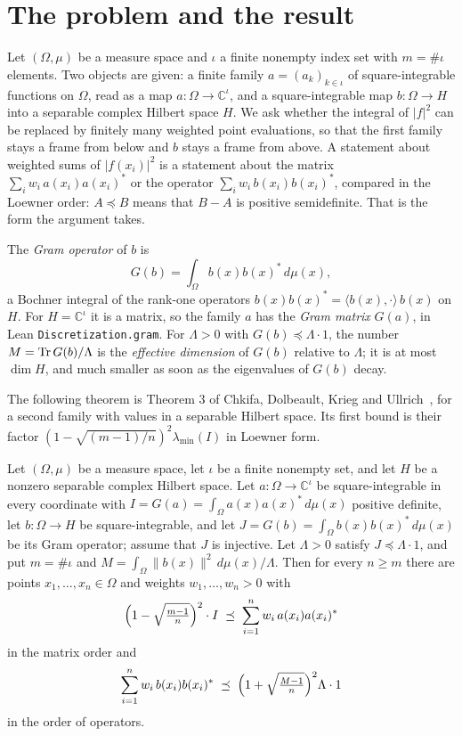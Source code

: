 
\chapter{The problem and the result}
\label{ch:problem}

Let $(\Omega, \mu)$ be a measure space and $\iota$ a finite nonempty index set with
$m = \#\iota$ elements. Two objects are given: a finite family $a = (a_k)_{k \in \iota}$ of
square-integrable functions on $\Omega$, read as a map $a : \Omega \to \mathbb{C}^{\iota}$,
and a square-integrable map $b : \Omega \to H$ into a separable complex Hilbert space $H$.
We ask whether the integral of $|f|^2$ can be replaced by finitely many weighted point
evaluations, so that the first family stays a frame from below and $b$ stays a frame from
above. A statement about weighted sums of $|f(x_i)|^2$ is a statement about the matrix
$\sum_i w_i \, a(x_i) a(x_i)^*$ or the operator $\sum_i w_i \, b(x_i) b(x_i)^*$, compared in
the Loewner order: $A \preceq B$ means that $B - A$ is positive semidefinite. That is the
form the argument takes.

The \emph{Gram operator} of $b$ is
\[
  G(b) = \int_\Omega b(x) b(x)^* \, d\mu(x),
\]
a Bochner integral of the rank-one operators
$b(x) b(x)^* = \langle b(x), \cdot \rangle \, b(x)$ on $H$. For $H = \mathbb{C}^{\iota}$ it
is a matrix, so the family $a$ has the \emph{Gram matrix} $G(a)$, in Lean
\texttt{Discretization.gram}. For $\Lambda > 0$ with $G(b) \preceq \Lambda \cdot 1$, the
number $M = \operatorname{Tr} G(b) / \Lambda$ is the \emph{effective dimension} of $G(b)$ relative to
$\Lambda$; it is at most $\dim H$, and much smaller as soon as the eigenvalues of $G(b)$
decay.

The following theorem is Theorem 3 of Chkifa, Dolbeault, Krieg and Ullrich~\cite{CDKU}, for
a second family with values in a separable Hilbert space. Its first bound is their factor
$(1 - \sqrt{(m-1)/n})^2 \lambda_{\min}(I)$ in Loewner form.

\begin{theorem}[Discretization]
\label{thm:discretization}
\leanok
Let $(\Omega, \mu)$ be a measure space, let $\iota$ be a finite nonempty set, and let $H$
be a nonzero separable complex Hilbert space. Let $a : \Omega \to \mathbb{C}^{\iota}$ be
square-integrable in every coordinate with $I = G(a) = \int_\Omega a(x) a(x)^* \, d\mu(x)$
positive definite, let $b : \Omega \to H$ be square-integrable, and let
$J = G(b) = \int_\Omega b(x) b(x)^* \, d\mu(x)$ be its Gram operator; assume that $J$ is
injective. Let $\Lambda > 0$ satisfy $J \preceq \Lambda \cdot 1$, and put $m = \#\iota$ and
$M = \int_\Omega \|b(x)\|^2 \, d\mu(x) / \Lambda$. Then for every $n \geq m$ there are points
$x_1, \dots, x_n \in \Omega$ and weights $w_1, \dots, w_n > 0$ with
\[
  \Bigl(1 - \sqrt{\tfrac{m-1}{n}}\Bigr)^2 \cdot I
    \; \preceq \; \sum_{i=1}^n w_i \, a(x_i) a(x_i)^*
\]
in the matrix order and
\[
  \sum_{i=1}^n w_i \, b(x_i) b(x_i)^*
    \; \preceq \; \Bigl(1 + \sqrt{\tfrac{M-1}{n}}\Bigr)^2 \Lambda \cdot 1
\]
in the order of operators.
\end{theorem}

